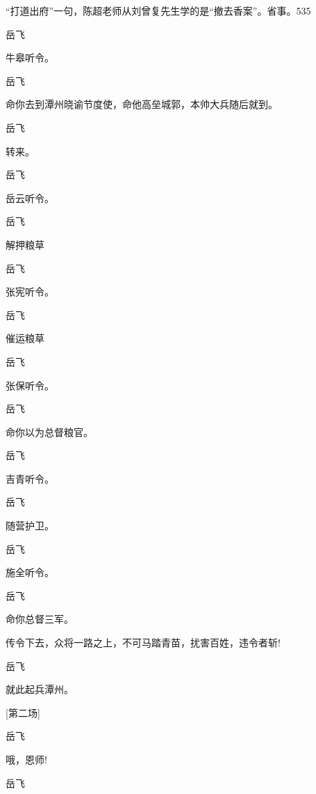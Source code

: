 {{{{``{打道出府}''一句，陈超老师从刘曾复先生学的是``{撤去香案}''。省事。{535}}

{岳飞\hspace{30pt}~

牛皋听令。}

{岳飞\hspace{30pt}~

命你去到潭州晓谕节度使，命他高垒城郭，本帅大兵随后就到。}

{岳飞\hspace{30pt}~

转来。}

{岳飞\hspace{30pt}~

岳云听令。}

{岳飞\hspace{30pt}~

解押粮草}

{岳飞\hspace{30pt}~

张宪听令。}

{岳飞\hspace{30pt}~

催运粮草}

{岳飞}\hspace{30pt}~

张保{听令。}

{岳飞\hspace{30pt}~

命你以为总督粮官。}

{岳飞\hspace{30pt}~

吉青听令。}

{岳飞\hspace{30pt}~

随营护卫。}

{岳飞\hspace{30pt}~

施全听令。}

{岳飞

命你总督三军。}传令下去，众将一路之上，不可马踏青苗，扰害百姓，违令者斩!

{岳飞}\hspace{30pt}~

就此起兵潭州。

{{[}第二场{]}}

{岳飞\hspace{30pt}~

哦，恩师!}

{岳飞\hspace{30pt}~

}}}}
